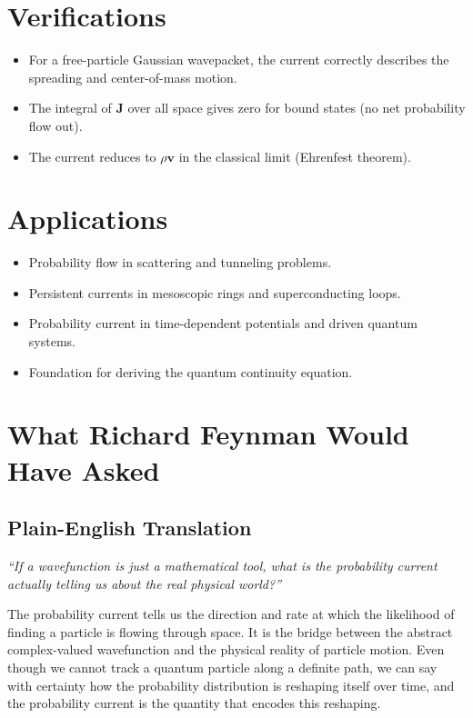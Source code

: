 \documentclass[11pt,openright]{book}
\begin{document}
\section*{Verifications}

\begin{itemize}
    \item For a free-particle Gaussian wavepacket, the current correctly describes the spreading and center-of-mass motion.
    \item The integral of $\mathbf{J}$ over all space gives zero for bound states (no net probability flow out).
    \item The current reduces to $\rho \mathbf{v}$ in the classical limit (Ehrenfest theorem).
\end{itemize}
\section*{Applications}

\begin{itemize}
    \item Probability flow in scattering and tunneling problems.
    \item Persistent currents in mesoscopic rings and superconducting loops.
    \item Probability current in time-dependent potentials and driven quantum systems.
    \item Foundation for deriving the quantum continuity equation.
\end{itemize}
\section*{What Richard Feynman Would Have Asked}

\subsection*{Plain-English Translation}
\textit{``If a wavefunction is just a mathematical tool, what is the probability current actually telling us about the real physical world?''}

The probability current tells us the direction and rate at which the likelihood of finding a particle is flowing through space. It is the bridge between the abstract complex-valued wavefunction and the physical reality of particle motion. Even though we cannot track a quantum particle along a definite path, we can say with certainty how the probability distribution is reshaping itself over time, and the probability current is the quantity that encodes this reshaping.
\end{document}
